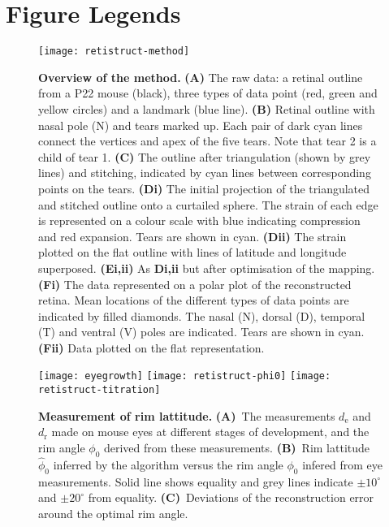 \documentclass[10pt]{article}
\begin{document}
\section*{Figure Legends}

\begin{figure}[!ht]
  \texttt{[image: retistruct-method]}

  \caption{\textbf{Overview of the method.} \textbf{(A)} The raw data:
    a retinal outline from a P22 mouse (black), three types of data
    point (red, green and yellow circles) and a landmark (blue
    line). \textbf{(B)} Retinal outline with nasal pole (N) and tears
    marked up. Each pair of dark cyan lines connect the vertices and
    apex of the five tears. Note that tear 2 is a child of tear
    1. \textbf{(C)} The outline after triangulation (shown by grey
    lines) and stitching, indicated by cyan lines between
    corresponding points on the tears.  \textbf{(Di)} The initial
    projection of the triangulated and stitched outline onto a
    curtailed sphere. The strain of each edge is represented on a colour
    scale with blue indicating compression and red expansion. Tears
    are shown in cyan. \textbf{(Dii)} The strain plotted on the flat
    outline with lines of latitude and longitude
    superposed. \textbf{(Ei,ii)} As \textbf{Di,ii} but after
    optimisation of the mapping. \textbf{(Fi)} The data represented on
    a polar plot of the reconstructed retina. Mean locations of the
    different types of data points are indicated by filled
    diamonds. The nasal (N), dorsal (D), temporal (T) and ventral (V)
    poles are indicated. Tears are shown in cyan. \textbf{(Fii)} Data
    plotted on the flat representation.}
  \label{fold-sphere:fig:method}
\end{figure}
\begin{figure}[!ht]
  \centering
  \texttt{[image: eyegrowth]}
  \texttt{[image: retistruct-phi0]}
  \texttt{[image: retistruct-titration]}
  \caption{\textbf{Measurement of rim lattitude.} \textbf{(A)}~The
    measurements $d_\mathrm{e}$ and $d_\mathrm{r}$ made on mouse eyes
    at different stages of development, and the rim angle $\phi_0$
    derived from these measurements. \textbf{(B)}~Rim lattitude
    $\hat{\phi}_0$ inferred by the algorithm versus the rim angle
    $\phi_0$ infered from eye measurements. Solid line shows equality
    and grey lines indicate $\pm10^\circ$ and $\pm20^\circ$ from
    equality. \textbf{(C)}~Deviations of the reconstruction error
    around the optimal rim angle.}
  \label{retistruct_plos:fig:eyegrowth}
\end{figure}
\end{document}
